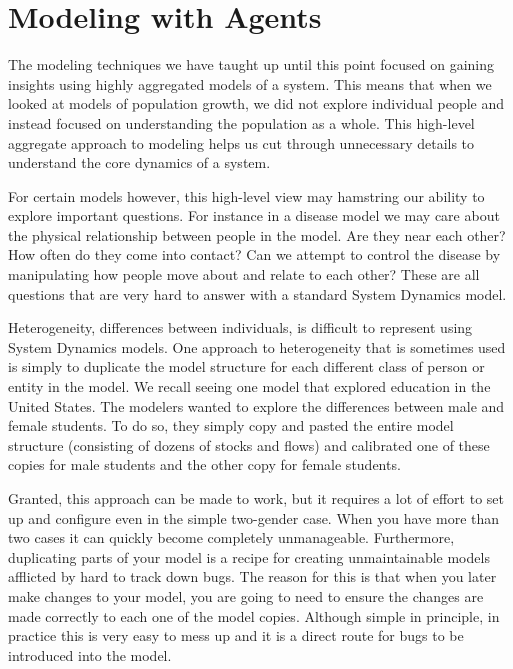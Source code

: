 \documentclass[]{memoir}
\begin{document}
\chapter{Modeling with Agents}

The modeling techniques we have taught up until this point focused on
gaining insights using highly aggregated models of a system. This means
that when we looked at models of population growth, we did not explore
individual people and instead focused on understanding the population as
a whole. This high-level aggregate approach to modeling helps us cut
through unnecessary details to understand the core dynamics of a system.

For certain models however, this high-level view may hamstring our
ability to explore important questions. For instance in a disease model
we may care about the physical relationship between people in the model.
Are they near each other? How often do they come into contact? Can we
attempt to control the disease by manipulating how people move about and
relate to each other? These are all questions that are very hard to
answer with a standard System Dynamics model.

Heterogeneity, differences between individuals, is difficult to
represent using System Dynamics models. One approach to heterogeneity
that is sometimes used is simply to duplicate the model structure for
each different class of person or entity in the model. We recall seeing
one model that explored education in the United States. The modelers
wanted to explore the differences between male and female students. To
do so, they simply copy and pasted the entire model structure
(consisting of dozens of stocks and flows) and calibrated one of these
copies for male students and the other copy for female students.

Granted, this approach can be made to work, but it requires a lot of
effort to set up and configure even in the simple two-gender case. When
you have more than two cases it can quickly become completely
unmanageable. Furthermore, duplicating parts of your model is a recipe
for creating unmaintainable models afflicted by hard to track down bugs.
The reason for this is that when you later make changes to your model,
you are going to need to ensure the changes are made correctly to each
one of the model copies. Although simple in principle, in practice this
is very easy to mess up and it is a direct route for bugs to be
introduced into the model.
\end{document}
